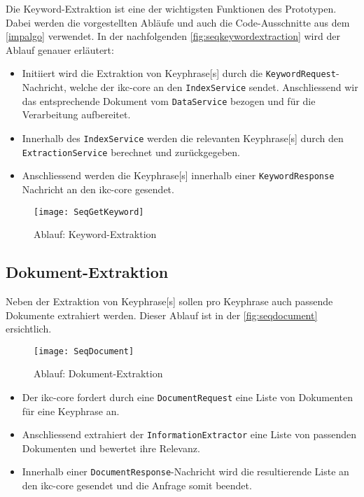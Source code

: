 Die \gls{Keyword}-Extraktion ist eine der wichtigsten Funktionen des Prototypen. Dabei werden die vorgestellten Abläufe und auch die Code-Ausschnitte aus dem \autoref{impalgo} verwendet. In der nachfolgenden \autoref{fig:seqkeywordextraction} wird der Ablauf genauer erläutert:
\begin{itemize}
    \item Initiiert wird die Extraktion von \gls{Keyphrase}[s] durch die \texttt{Key\-word\-Re\-qu\-est}-Nachricht, welche der \gls{ikc-core} an den \texttt{IndexService} sendet. Anschliessend wir das entsprechende Dokument vom \texttt{Da\-ta\-Ser\-vi\-ce} bezogen und für die Verarbeitung aufbereitet. 
    \item Innerhalb des \texttt{IndexService} werden die relevanten \gls{Keyphrase}[s] durch den \texttt{ExtractionService} berechnet und zurückgegeben.
    \item Anschliessend werden die \gls{Keyphrase}[s] innerhalb einer \texttt{Key\-word\-Re\-spon\-se} Nachricht an den \gls{ikc-core} gesendet.
\end{itemize}

    \begin{figure}[H]
    \centering
    \texttt{[image: SeqGetKeyword]}
    \caption{Ablauf: \gls{Keyword}-Extraktion}
    \label{fig:seqkeywordextraction}
    \end{figure}


\subsection{Dokument-Extraktion}



Neben der Extraktion von \gls{Keyphrase}[s] sollen pro \gls{Keyphrase} auch passende Dokumente extrahiert werden. Dieser Ablauf ist in der \autoref{fig:seqdocument} ersichtlich.

    \begin{figure}[H]
    \centering
    \texttt{[image: SeqDocument]}
    \caption{Ablauf: Dokument-Extraktion}
    \label{fig:seqdocument}
    \end{figure}

\begin{itemize}
    \item Der \gls{ikc-core} fordert durch eine \texttt{DocumentRequest} eine Liste von Dokumenten für eine \gls{Keyphrase} an. 
    \item Anschliessend extrahiert der \texttt{InformationExtractor} eine Liste von passenden Dokumenten und bewertet ihre Relevanz. 
    \item Innerhalb einer \texttt{DocumentResponse}-Nachricht wird die resultierende Liste an den \gls{ikc-core} gesendet und die Anfrage somit beendet.
\end{itemize}

